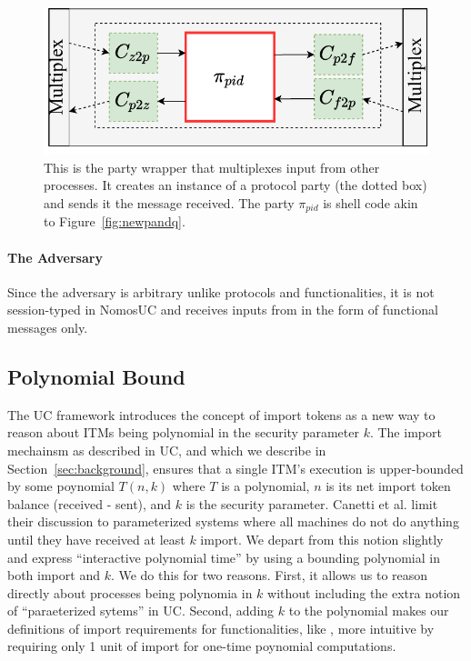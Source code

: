 \begin{figure}
	\centering
	\includegraphics[scale=0.5]{figures/singleshellmultiplex.pdf}
	\caption{This is the party wrapper that multiplexes input from other processes. It creates an instance of a protocol party (the dotted box) and sends it the message received. The party $\pi_{pid}$ is shell code akin to Figure~\ref{fig:newpandq}.}
	\label{fig:singlemultiplex}
	\vspace{-3mm}
\end{figure}


\paragraph*{\textbf{The Adversary}}
Since the adversary is arbitrary unlike protocols and functionalities, it is not session-typed in NomosUC and receives inputs from \Z in the form of functional messages only.

\subsection{Polynomial Bound}
The UC framework introduces the concept of import tokens as a new way to reason about ITMs being polynomial in the security parameter $k$. 
The import mechainsm as described in UC, and which we describe in Section~\ref{sec:background}, ensures that a single ITM's execution is upper-bounded by some poynomial $T(n,k)$ where $T$ is a polynomial, $n$ is its net import token balance (received - sent), and $k$ is the security parameter.
Canetti et al. limit their discussion to parameterized systems where all machines do not do anything until they have received at least $k$ import.
We depart from this notion slightly and express ``interactive polynomial time'' by using a bounding polynomial in both import and $k$.
We do this for two reasons.
First, it allows us to reason directly about processes being polynomia in $k$ without including the extra notion of ``paraeterized sytems'' in UC.
Second, adding $k$ to the polynomial makes our definitions of import requirements for functionalities, like \Fro, more intuitive by requiring only 1 unit of import for one-time poynomial computations.

